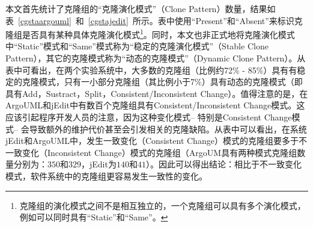 本文首先统计了克隆组的{“克隆演化模式”（Clone Pattern）}数量，结果如表~\ref{cgstaargouml}~和~\ref{cgstajedit}~所示。表中使用“Present”和“Absent”来标识克隆组是否具有某种具体克隆演化模式\footnote{克隆组的演化模式之间不是相互独立的，一个克隆组可以具有多个演化模式，例如可以同时具有“Static”和“Same”。}。同时，本文也非正式地将克隆演化模式中“Static”模式和“Same”模式称为“稳定的克隆演化模式”（Stable Clone Pattern），其它的克隆模式称为“动态的克隆模式”（Dynamic Clone Pattern）。从表中可看出，在两个实验系统中，大多数的克隆组（比例约72\% - 85\%）具有有稳定的克隆模式，只有一小部分克隆组（其比例小于7\%）具有动态的克隆模式（即具有Add，Sustract，Split，Consistent/Inconsistent Change）。值得注意的是，在ArgoUML和jEdit中有数百个克隆组具有Consistent/Inconsistent Change模式。这应该引起程序开发人员的注意，因为这种变化模式-- 特别是Consistent Change模式-- 会导致额外的维护代价甚至会引发相关的克隆缺陷。从表中可以看出，在系统jEdit和ArgoUML中，发生一致变化（Consistent Change）模式的克隆组要多于不一致变化（Inconsistent Change）模式的克隆组（ArgoUM具有两种模式克隆组数量分别为：$350$和$329$，jEdit为$140$和$41$）。因此可以得出结论：相比于不一致变化模式，软件系统中的克隆组更容易发生一致性的变化。

